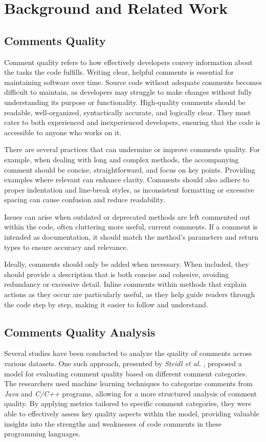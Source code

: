 
\chapter{Background and Related Work} %

\label{Chapter2} 

\section{Comments Quality}
Comment quality refers to how effectively developers convey information about the tasks the code fulfills. Writing clear, helpful comments is essential for maintaining software over time. Source code without adequate comments becomes difficult to maintain, as developers may struggle to make changes without fully understanding its purpose or functionality. High-quality comments should be readable, well-organized, syntactically accurate, and logically clear. They must cater to both experienced and inexperienced developers, ensuring that the code is accessible to anyone who works on it.

\noindent There are several practices that can undermine or improve comments quality. For example, when dealing with long and complex methods, the accompanying comment should be concise, straightforward, and focus on key points. Providing examples where relevant can enhance clarity. Comments should also adhere to proper indentation and line-break styles, as inconsistent formatting or excessive spacing can cause confusion and reduce readability.

\noindent Issues can arise when outdated or deprecated methods are left commented out within the code, often cluttering more useful, current comments. If a comment is intended as documentation, it should match the method’s parameters and return types to ensure accuracy and relevance.

\noindent Ideally, comments should only be added when necessary. When included, they should provide a description that is both concise and cohesive, avoiding redundancy or excessive detail. Inline comments within methods that explain actions as they occur are particularly useful, as they help guide readers through the code step by step, making it easier to follow and understand.

\section{Comments Quality Analysis}
Several studies have been conducted to analyze the quality of comments across various datasets. One such approach, presented by \textit{Steidl et al.} \cite{steidl2013}, proposed a model for evaluating comment quality based on different comment categories. The researchers used machine learning techniques to categorize comments from \textit{Java} and \textit{C/C++} programs, allowing for a more structured analysis of comment quality. By applying metrics tailored to specific comment categories, they were able to effectively assess key quality aspects within the model, providing valuable insights into the strengths and weaknesses of code comments in these programming languages.


